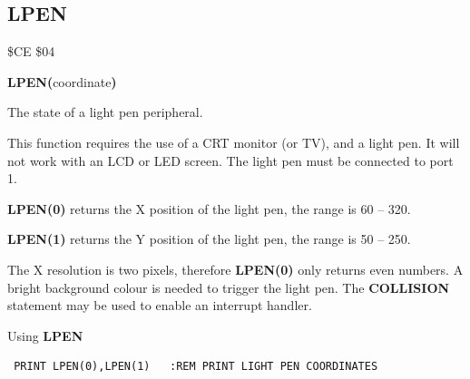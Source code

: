 \subsection{LPEN}
\begin{description}[leftmargin=2cm,style=nextline]
\item [Token:] \$CE \$04
\item [Format:] {\bf LPEN(}coordinate{\bf)}
\item [Returns:] The state of a light pen peripheral.

               This function requires the use of a
               CRT monitor (or TV), and a light pen.
               It will not work with an LCD or LED screen.
               The light pen must be connected to port 1.

               {\bf LPEN(0)} returns the X position of the light pen,
               the range is 60 -- 320.

               {\bf LPEN(1)} returns the Y position of the light pen,
               the range is 50 -- 250.

\item [Remarks:] The X resolution is two pixels, therefore {\bf LPEN(0)} only
                 returns even numbers.
                 A bright background colour is needed to trigger
                 the light pen. The {\bf COLLISION} statement may
                 be used to enable an interrupt handler.

\item [Example:] Using {\bf LPEN}
\begin{tcolorbox}[colback=black,coltext=white]
\verbatimfont{\codefont}
\begin{verbatim}
 PRINT LPEN(0),LPEN(1)   :REM PRINT LIGHT PEN COORDINATES
\end{verbatim}
\end{tcolorbox}
\end{description}


\newpage
